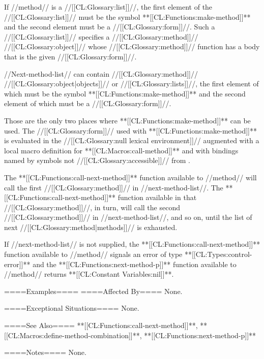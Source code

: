 If //method// is a //[[CL:Glossary:list]]//, the first element of the //[[CL:Glossary:list]]// must be the symbol **[[CL:Functions:make-method]]** and the second element must be a //[[CL:Glossary:form]]//. Such a //[[CL:Glossary:list]]// specifies a //[[CL:Glossary:method]]// //[[CL:Glossary:object]]// whose //[[CL:Glossary:method]]// function has a body that is the given //[[CL:Glossary:form]]//.

//Next-method-list// can contain //[[CL:Glossary:method]]// //[[CL:Glossary:object|objects]]// or //[[CL:Glossary:lists]]//, the first element of which must be the symbol **[[CL:Functions:make-method]]** and the second element of which must be a //[[CL:Glossary:form]]//.

Those are the only two places where **[[CL:Functions:make-method]]** can be used. The //[[CL:Glossary:form]]// used with **[[CL:Functions:make-method]]** is evaluated in the //[[CL:Glossary:null lexical environment]]// augmented with a local macro definition for **[[CL:Macros:call-method]]** and with bindings named by symbols not //[[CL:Glossary:accessible]]// from .

The **[[CL:Functions:call-next-method]]** function available to //method// will call the first //[[CL:Glossary:method]]// in //next-method-list//. The **[[CL:Functions:call-next-method]]** function available in that //[[CL:Glossary:method]]//, in turn, will call the second //[[CL:Glossary:method]]// in //next-method-list//, and so on, until the list of next //[[CL:Glossary:method|methods]]// is exhausted.

If //next-method-list// is not supplied, the **[[CL:Functions:call-next-method]]** function available to //method// signals an error of type **[[CL:Types:control-error]]** and the **[[CL:Functions:next-method-p]]** function available to //method// returns {**[[CL:Constant Variables:nil]]**}.

====Examples====
====Affected By====
None.

====Exceptional Situations====
None.

====See Also====
**[[CL:Functions:call-next-method]]**, **[[CL:Macros:define-method-combination]]**, **[[CL:Functions:next-method-p]]**

====Notes====
None.

